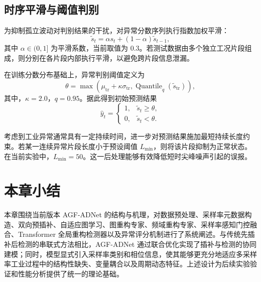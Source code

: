 \subsection{时序平滑与阈值判别}

为抑制孤立波动对判别结果的干扰，对异常分数序列执行指数加权平滑：
\begin{equation}
    \tilde{s}_t = \alpha s_t + (1-\alpha)\tilde{s}_{t-1},
\end{equation}
其中 $\alpha \in (0,1]$ 为平滑系数，当前取值为 $0.3$。若测试数据由多个独立工况片段组成，则分别在各片段内部执行平滑，以避免跨片段信息泄漏。

在训练分数分布基础上，异常判别阈值定义为
\begin{equation}
    \theta
    =
    \max
    \left(
        \mu_{\mathrm{tr}} + \kappa \sigma_{\mathrm{tr}},
        \operatorname{Quantile}_{q}(\tilde{s}_{\mathrm{tr}})
    \right),
\end{equation}
其中，$\kappa=2.0$，$q=0.95$。据此得到初始预测结果
\begin{equation}
    \hat{y}_t =
    \begin{cases}
        1, & \tilde{s}_t \geq \theta, \\
        0, & \tilde{s}_t < \theta.
    \end{cases}
\end{equation}

考虑到工业异常通常具有一定持续时间，进一步对预测结果施加最短持续长度约束。若某一连续异常片段长度小于预设阈值 $L_{\min}$，则将该片段抑制为正常状态。在当前实验中，$L_{\min}=50$。这一后处理能够有效降低短时尖峰噪声引起的误报。

\section{本章小结}

本章围绕当前版本 AGF-ADNet 的结构与机理，对数据预处理、采样率元数据构造、双向预插补、自适应图学习、图重构专家、频域重构专家、采样率感知门控融合、Transformer 全局重构检测器以及异常评分机制进行了系统阐述。与传统先插补后检测的串联式方法相比，AGF-ADNet 通过联合优化实现了插补与检测的协同建模；同时，模型显式引入采样率类别和相位信息，使其能够更充分地适应多采样率工业过程中的结构性缺失、变量耦合以及周期动态特征。上述设计为后续实验验证和性能分析提供了统一的理论基础。
